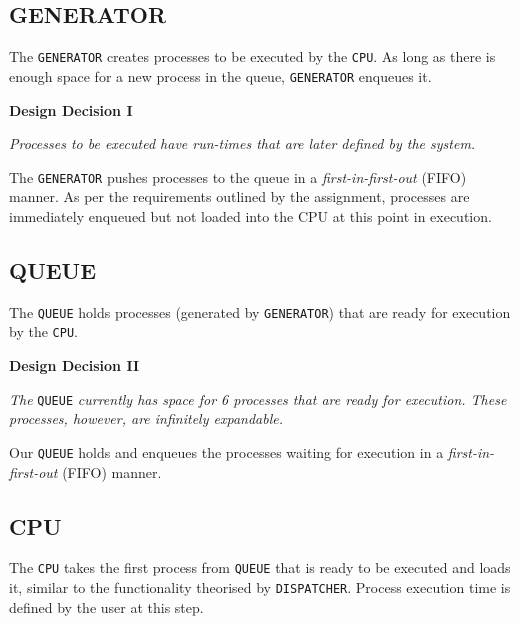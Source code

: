 \documentclass[]{article}
\begin{document}
\subsection*{GENERATOR}
The \verb|GENERATOR| creates processes to be executed by the \verb|CPU|. As long as there is enough space for a new process in the queue, \verb|GENERATOR| enqueues it. \par \vspace{2mm}

\begin{mdframed}[backgroundcolor=lightgray!40]
	\textbf{Design Decision I} \par 
	\textit{Processes to be executed have run-times that are later defined by the system.}
\end{mdframed}

\vspace{2mm}

The \verb|GENERATOR| pushes processes to the queue in a \textit{first-in-first-out} (FIFO) manner. As per the requirements outlined by the assignment,  processes are immediately enqueued but not loaded into the CPU at this point in execution. 

\subsection*{QUEUE}
The \verb|QUEUE| holds processes (generated by \verb|GENERATOR|) that are ready for execution by the \verb|CPU|. \par \vspace{2mm}

\begin{mdframed}[backgroundcolor=lightgray!40]
	\textbf{Design Decision II} \par 
	\textit{The} \verb|QUEUE| \textit{currently has space for 6 processes that are ready for execution. These processes, however, are infinitely expandable.}
\end{mdframed}

\vspace{2mm}

Our \verb|QUEUE| holds and enqueues the processes waiting for execution in a  \textit{first-in-first-out} (FIFO) manner. 

\subsection*{CPU}
The \verb|CPU| takes the first process from \verb|QUEUE| that is ready to be executed and loads it, similar to the functionality theorised by \verb|DISPATCHER|. Process execution time is defined by the user at this step. \par \vspace{2mm}
\end{document}
